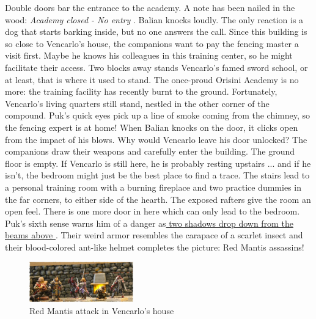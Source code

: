 Double doors bar the entrance to the academy. A note has been nailed in the wood: {\itshape Academy closed - No entry} . Balian knocks loudly. The only reaction is a dog that starts barking inside, but no one answers the call. Since this building is so close to Vencarlo's house, the companions want to pay the fencing master a visit first. Maybe he knows his colleagues in this training center, so he might facilitate their access. Two blocks away stands Vencarlo's famed sword school, or at least, that is where it used to stand. The once-proud Orisini Academy is no more: the training facility has recently burnt to the ground. Fortunately, Vencarlo's living quarters still stand, nestled in the other corner of the compound. Puk's quick eyes pick up a line of smoke coming from the chimney, so the fencing expert is at home! When Balian knocks on the door, it clicks open from the impact of his blows. Why would Vencarlo leave his door unlocked? The companions draw their weapons and carefully enter the building. The ground floor is empty. If Vencarlo is still here, he is probably resting upstairs ... and if he isn't, the bedroom might just be the best place to find a trace. The stairs lead to a personal training room with a burning fireplace and two practice dummies in the far corners, to either side of the hearth. The exposed rafters give the room an open feel. There is one more door in here which can only lead to the bedroom. Puk's sixth sense warns him of a danger as\hyperref[fig:Red-Mantis-attack-in-Vencarlo-s-house-548844795]{ two shadows drop down from the beams above } . Their weird armor resembles the carapace of a scarlet insect and their blood-colored ant-like helmet completes the picture: Red Mantis assassins! \\

\begin{figure}[h]
	\centering
	\includegraphics[width=0.4\textwidth]{images/Red-Mantis-attack-in-Vencarlo-s-house-548844795_mod.jpg}
	\caption{Red Mantis attack in Vencarlo's house}
	\label{fig:Red-Mantis-attack-in-Vencarlo-s-house-548844795}
\end{figure}

